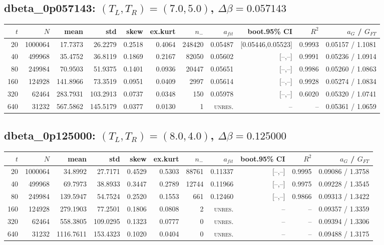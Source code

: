 \documentclass[10pt]{article}
\begin{document}
\subsection*{dbeta\_0p057143: $(T_L,T_R)=(7.0,5.0)$, $\Delta\beta=0.057143$}
\scriptsize\begin{longtable}{rrrrrrrrrrr}
\toprule $t$ & $N$ & mean & std & skew & ex.kurt & $n_-$ & $a_{fit}$ & boot.95\% CI & $R^2$ & $a_G$ / $G_{FT}$ \\
\midrule\endhead
20 & 1000064 & 17.7373 & 26.2279 & 0.2518 & 0.4064 & 248420 & 0.05487 & [0.05446,0.05523] & 0.9993 & 0.05157 / 1.1081 \\
40 & 499968 & 35.4752 & 36.8119 & 0.1869 & 0.2167 & 82050 & 0.05602 & [--,--] & 0.9991 & 0.05236 / 1.0914 \\
80 & 249984 & 70.9503 & 51.9375 & 0.1401 & 0.0936 & 20447 & 0.05651 & [--,--] & 0.9986 & 0.05260 / 1.0863 \\
160 & 124928 & 141.8966 & 73.3519 & 0.0951 & 0.0409 & 2997 & 0.05614 & [--,--] & 0.9928 & 0.05274 / 1.0834 \\
320 & 62464 & 283.7931 & 103.2913 & 0.0737 & 0.0348 & 150 & 0.05978 & [--,--] & 0.6020 & 0.05320 / 1.0741 \\
640 & 31232 & 567.5862 & 145.5179 & 0.0377 & 0.0130 & 1 & \textsc{unres.} & -- & -- & 0.05361 / 1.0659 \\
\bottomrule\end{longtable}\normalsize
\subsection*{dbeta\_0p125000: $(T_L,T_R)=(8.0,4.0)$, $\Delta\beta=0.125000$}
\scriptsize\begin{longtable}{rrrrrrrrrrr}
\toprule $t$ & $N$ & mean & std & skew & ex.kurt & $n_-$ & $a_{fit}$ & boot.95\% CI & $R^2$ & $a_G$ / $G_{FT}$ \\
\midrule\endhead
20 & 1000064 & 34.8992 & 27.7171 & 0.4529 & 0.5303 & 88761 & 0.11337 & [--,--] & 0.9995 & 0.09086 / 1.3758 \\
40 & 499968 & 69.7973 & 38.8933 & 0.3447 & 0.2789 & 12744 & 0.11966 & [--,--] & 0.9975 & 0.09228 / 1.3545 \\
80 & 249984 & 139.5947 & 54.7524 & 0.2520 & 0.1553 & 661 & 0.12460 & [--,--] & 0.9866 & 0.09313 / 1.3422 \\
160 & 124928 & 279.1903 & 77.2501 & 0.1806 & 0.0808 & 2 & \textsc{unres.} & -- & -- & 0.09357 / 1.3359 \\
320 & 62464 & 558.3805 & 109.0295 & 0.1323 & 0.0777 & 0 & \textsc{unres.} & -- & -- & 0.09394 / 1.3306 \\
640 & 31232 & 1116.7611 & 153.4323 & 0.1020 & 0.0404 & 0 & \textsc{unres.} & -- & -- & 0.09488 / 1.3175 \\
\bottomrule\end{longtable}\normalsize
\end{document}
